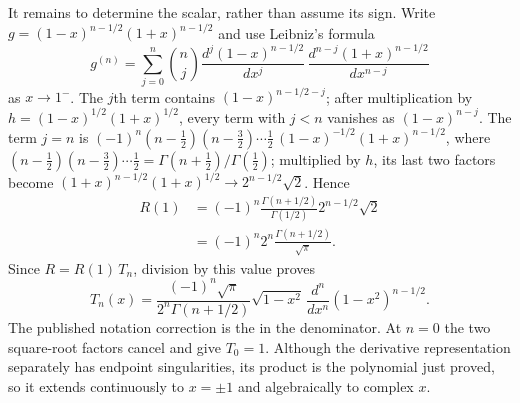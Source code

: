 It remains to determine the scalar, rather than assume its sign.
Write $g=(1-x)^{n-1/2}(1+x)^{n-1/2}$ and use Leibniz's formula
\[
g^{(n)}=\sum_{j=0}^n\binom nj
 \frac{d^j(1-x)^{n-1/2}}{dx^j}\,
 \frac{d^{n-j}(1+x)^{n-1/2}}{dx^{n-j}}
\]
as $x\to1^-$.  The $j$th term contains $(1-x)^{n-1/2-j}$; after
multiplication by $h=(1-x)^{1/2}(1+x)^{1/2}$, every term with
$j<n$ vanishes as $(1-x)^{n-j}$.  The term $j=n$ is
$(-1)^n(n-\frac12)(n-\frac32)\cdots\frac12\,(1-x)^{-1/2}(1+x)^{n-1/2}$,
where $(n-\frac12)(n-\frac32)\cdots\frac12
=\Gamma(n+\frac12)/\Gamma(\frac12)$; multiplied by $h$, its last
two factors become $(1+x)^{n-1/2}(1+x)^{1/2}\to2^{n-1/2}\sqrt2$.
Hence
\begin{align*}
R(1)
 &=(-1)^n\frac{\Gamma(n+1/2)}{\Gamma(1/2)}
       2^{n-1/2}\sqrt2\\
 &=(-1)^n2^n\frac{\Gamma(n+1/2)}{\sqrt\pi}.
\end{align*}
Since $R=R(1)\,T_n$, division by this value proves
\[
\boxed{T_n(x)=\frac{(-1)^n\sqrt\pi}{2^n\Gamma(n+1/2)}
 \sqrt{1-x^2}\,\frac{d^n}{dx^n}(1-x^2)^{n-1/2}}.
\]
The published notation correction is the
 in the denominator.
At $n=0$ the two square-root factors cancel and give $T_0=1$.
Although the derivative representation separately has endpoint
singularities, its product is the polynomial just proved, so it
extends continuously to $x=\pm1$ and algebraically to complex $x$.


